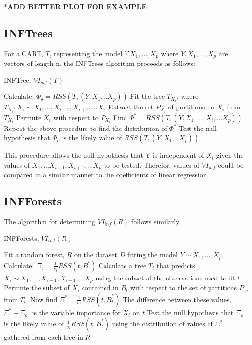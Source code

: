 \documentclass[12pt,twoside]{reedthesis}
\begin{document}
  *\textbf{ADD BETTER PLOT FOR EXAMPLE}
  
  \subsection{INFTrees}\label{inftrees}
  
  For a CART, \(T\), representing the model \(Y~X_1,...,X_p\) where
  \(Y,X_1,...,X_p\) are vectors of length n, the INFTrees algorithm
  proceeds as follows:
  
  \begin{algorithm}
  \caption{INFTree, $VI_{inf}(T)$}
  \label{inftree}
  \begin{algorithmic}
  \State Calculate: $\Phi_o =  RSS(T, (Y,X_1,..X_p))$
  \State Fit the tree $T_{X_i}$, where $T_{X_i} : X_i \sim X_1,...,X_{i-1}, X_{i+1},...X_p$
  \State Extract the set $P_{X_i}$ of partitions on $X_i$ from $T_{X_i}$
  \State Permute $X_i$ with respect to $P_{X_i}$
  \State Find $\Phi^* =  RSS(T, (Y,X_1,..., \bar{X_i},...X_p))$
  \State Repeat the above procedure to find the distribution of $\Phi^*$
  \State Test the null hypothesis that $\Phi_o$ is the likely value of $RSS(T, (Y,X_1,..X_p))$
  \EndFor
  \end{algorithmic}
  \end{algorithm}
  
  This procedure allows the null hypothesis that Y is independent of
  \(X_i\) given the values of \(X_1,...X_{i-1},X_{i+1},...X_p\) to be
  tested. Therefor, values of \(VI_{inf}\) could be compared in a similar
  manner to the coefficients of linear regression.
  
  \subsection{INFForests}\label{infforests}
  
  The algorithm for determining \(VI_{inf}(R)\) follows similarly.
  
  \begin{algorithm}
  \caption{INFForests, $VI_{inf}(R)$}
  \label{infforest}
  \begin{algorithmic}[1]
  \State Fit a random forest, $R$ on the dataset $D$ fitting the model $Y \sim X_1,...,X_p$.
  \State Calculate: $\Xi_o =  \frac 1 {\nu_t} RSS(t,\bar{B}^t)$
  \State Calculate a tree $T_i$ that predicts $X_i \sim X_1,...,X_{i-1}, X_{i+1},...X_p$ using the subset of the observations used to fit $t$  
  \State Permute the subset of $X_i$ contained in $\bar{B}_t$ with respect to the set of partitions $P_{xi}$ from $T_i$.
  \State Now find $\Xi^* =  \frac 1 {\nu_t} RSS(t,\bar{B}_t^*)$
  \State The difference between these values, $\Xi^* - \Xi_o$,  is the variable importance for $X_i$ on $t$
  \EndFor
  \State Test the null hypothesis that $\Xi_o$ is the likely value of $\frac 1 {\nu_t} RSS(t,\bar{B}_t^*)$ using the distribution of values of $\Xi^*$ gathered from each tree in $R$
  \EndFor
  \end{algorithmic}
  \end{algorithm}
  
\end{document}
